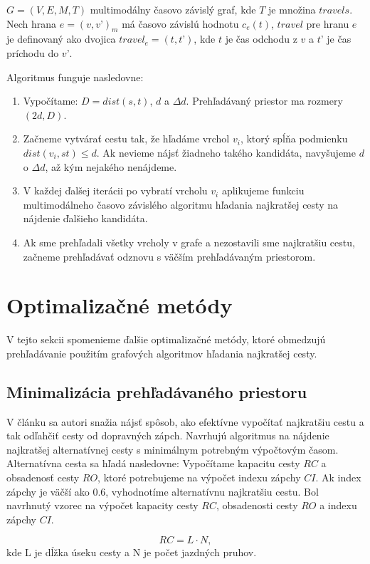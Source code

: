 $G = (V, E, M, T)$ multimodálny časovo závislý graf, kde $T$ je množina $travels$.
Nech hrana $e = (v, v’)_m$ má časovo závislú hodnotu $c_e(t)$, $travel$ pre hranu $e$ je definovaný ako dvojica $travel_e = (t, t’)$, kde $t$ je čas odchodu z $v$ a $t’$ je čas príchodu do $v’$.

Algoritmus funguje nasledovne:
\begin{enumerate}
\item Vypočítame: $D = dist(s,t)$, $d$ a $\Delta d$. Prehľadávaný priestor ma rozmery $(2d,D)$.
\item Začneme vytvárať cestu tak, že hľadáme vrchol $v_i$, ktorý spĺňa podmienku \\$dist(v_i, st) \leq d$. Ak nevieme nájsť žiadneho takého kandidáta, navyšujeme $d$ o $\Delta d$, až kým nejakého nenájdeme.
\item V každej ďalšej iterácii po vybratí vrcholu $v_i$ aplikujeme funkciu multimodálneho časovo závislého algoritmu hľadania najkratšej cesty na nájdenie ďalšieho kandidáta.
\item Ak sme prehľadali všetky vrcholy v grafe a nezostavili sme najkratšiu cestu, začneme prehľadávať odznovu s väčším prehľadávaným priestorom.
\end{enumerate}


\section{Optimalizačné metódy}
V tejto sekcii spomenieme ďalšie optimalizačné metódy, ktoré obmedzujú prehľadávanie použitím grafových algoritmov hľadania najkratšej cesty.

\subsection{Minimalizácia prehľadávaného priestoru}

V článku \cite{alternate} sa autori snažia nájsť spôsob, ako efektívne vypočítať najkratšiu cestu a tak odľahčiť cesty od dopravných zápch. Navrhujú algoritmus na nájdenie najkratšej alternatívnej cesty s minimálnym potrebným výpočtovým časom. Alternatívna cesta sa hľadá nasledovne: 
Vypočítame kapacitu cesty $RC$ a obsadenosť cesty $RO$, ktoré potrebujeme na výpočet indexu zápchy $CI$. Ak index zápchy je väčší ako $0.6$, vyhodnotíme alternatívnu najkratšiu cestu. Bol navrhnutý vzorec na výpočet kapacity cesty $RC$, obsadenosti cesty $RO$ a indexu zápchy $CI$. 

$$RC = L \cdot N,$$ kde L je dĺžka úseku cesty a N je počet jazdných pruhov. 

